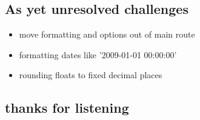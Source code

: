 \documentclass[11pt]{article}
\begin{document}
\subsection*{As yet unresolved challenges}
\label{sec:orgheadline36}
\begin{itemize}
\item move formatting and options out of main route
\item formatting dates like '2009-01-01 00:00:00'
\item rounding floats to fixed decimal places
\end{itemize}
\subsection*{thanks for listening}
\label{sec:orgheadline37}
\end{document}
